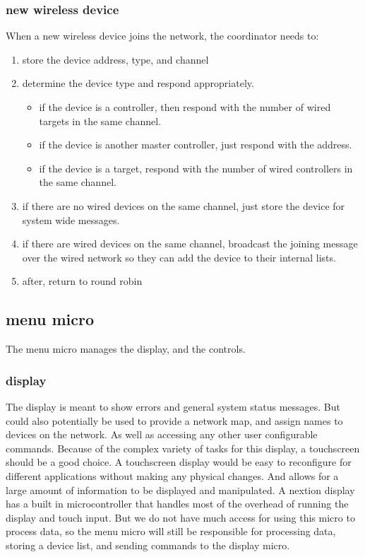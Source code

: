 \documentclass{article}
\begin{document}
     \subsubsection{new wireless device}
     When a new wireless device joins the network, the coordinator needs to:
     \begin{enumerate}
     	\item store the device address, type, and channel
     	\item determine the device type and respond appropriately.
     	\begin{itemize}
     		\item if the device is a controller, then respond with the number of wired targets in the same channel.
     		\item if the device is another master controller, just respond with the address.
     		\item if the device is a target, respond with the number of wired controllers in the same channel.
     	\end{itemize}
     	\item if there are no wired devices on the same channel, just store the device for system wide messages.
     	
     	\item if there are wired devices on the same channel, broadcast the joining message over the wired network so they can add the device to their internal lists.
     	
     	\item after, return to round robin
     \end{enumerate}
     \subsection{menu micro}
     The menu micro manages the display, and the controls.
     \subsubsection{display}
     The display is meant to show errors and general system status messages.
     But could also potentially be used to provide a network map,
      and assign names to devices on the network.
      As well as accessing any other user configurable commands.
     Because of the complex variety of tasks for this display, a touchscreen should be a good choice.
     A touchscreen display would be easy to reconfigure for different applications without making any physical changes.
     And allows for a large amount of information to be displayed and manipulated.
     A nextion display has a built in microcontroller that handles most of the overhead of running the display and touch input.
     But we do not have much access for using this micro to process data,
     so the menu micro will still be responsible for processing data, storing a device list,
     and sending commands to the display micro.
     
\end{document}
